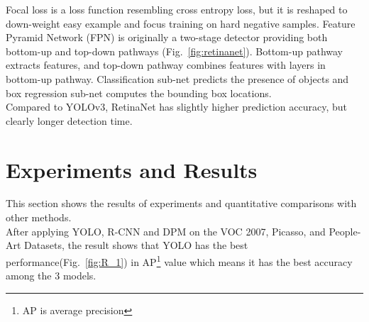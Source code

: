 \documentclass[letterpaper]{article} %
\begin{document}
\noindent Focal loss is a loss function resembling cross entropy loss, but it is reshaped to down-weight easy example and focus training on hard negative samples. Feature Pyramid Network (FPN) is originally a two-stage detector providing both bottom-up and top-down pathways (Fig.~\ref{fig:retinanet}). Bottom-up pathway extracts features, and top-down pathway combines features with layers in bottom-up pathway. Classification sub-net predicts the presence of objects and box regression sub-net computes the bounding box locations.\\

\noindent Compared to YOLOv3, RetinaNet has slightly higher prediction accuracy, but clearly longer detection time.

\section{Experiments and Results}
This section shows the results of experiments and quantitative comparisons with other methods.\\

\noindent After applying YOLO, R-CNN and DPM on the VOC 2007, Picasso, and People-Art Datasets, the result shows that YOLO has the best performance(Fig.~\ref{fig:R_1}) in AP\footnote{AP is average precision} value which means it has the best accuracy among the 3 models.
\end{document}
